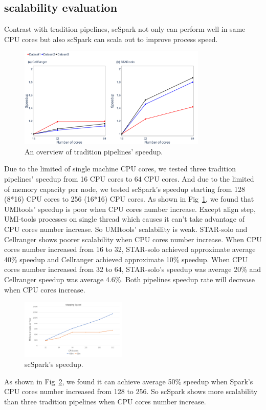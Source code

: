 \documentclass[conference]{IEEEtran}
\begin{document}
\subsection{scalability evaluation} 
Contrast with tradition pipelines, scSpark not only can perform well in same CPU cores but also scSpark can scala out to improve process speed.
\begin{figure}
	\includegraphics[width=0.8\textwidth]{fig5.pdf}
	\caption{An overview of tradition pipelines' speedup.} \label{fig5}
\end{figure}
Due to the limited of single machine CPU cores, we tested three tradition pipelines' speedup from 16 CPU cores to 64 CPU cores.
And due to the limited of memory capacity per node, we tested scSpark's speedup starting from 128 (8*16) CPU cores to 256 (16*16) CPU cores.
As shown in Fig~\ref{fig5}, we found that UMI\-tools' speedup is poor when CPU cores number increase.
Except align step, UMI-tools processes on single thread which causes it can't take advantage of CPU cores number increase.
So UMI\-tools' scalability is weak.
STAR-solo and Cellranger shows poorer scalability when CPU cores number increase.
When CPU cores number increased from 16 to 32, STAR-solo achieved approximate average 40\% speedup and Cellranger achieved approximate 10\% speedup.
When CPU cores number increased from 32 to 64, STAR-solo's speedup was average 20\% and Cellranger speedup was average 4.6\%.
Both pipelines speedup rate will decrease when CPU cores increase.

\begin{figure}
	\includegraphics[width=0.45\textwidth]{fig6.pdf}
	\caption{scSpark's speedup.} \label{fig6}
\end{figure}
As shown in Fig~\ref{fig6}, we found it can achieve average 50\% speedup when Spark's CPU cores number increased from 128 to 256.
So scSpark shows more scalability than three tradition pipelines when CPU cores number increase.
\end{document}
